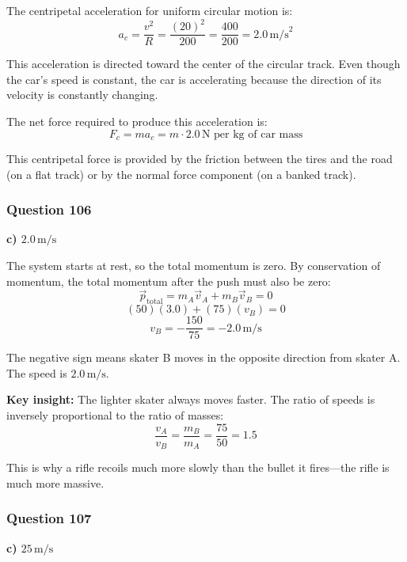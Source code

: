 \documentclass[12pt,letterpaper]{article}
\begin{document}
\begin{explanationbox}
The centripetal acceleration for uniform circular motion is:
\[
a_c = \frac{v^2}{R} = \frac{(20)^2}{200} = \frac{400}{200} = 2.0\,\text{m/s}^2
\]

This acceleration is directed toward the center of the circular track. Even though the car's speed is constant, the car is accelerating because the direction of its velocity is constantly changing.

The net force required to produce this acceleration is:
\[
F_c = ma_c = m \cdot 2.0\,\text{N per kg of car mass}
\]

This centripetal force is provided by the friction between the tires and the road (on a flat track) or by the normal force component (on a banked track).
\end{explanationbox}

\subsubsection*{Question 106}

\begin{answerbox}
\textbf{c) $2.0\,\text{m/s}$}
\end{answerbox}

\begin{explanationbox}
The system starts at rest, so the total momentum is zero. By conservation of momentum, the total momentum after the push must also be zero:
\[
\vec{p}_{\text{total}} = m_A \vec{v}_A + m_B \vec{v}_B = 0
\]
\[
(50)(3.0) + (75)(v_B) = 0
\]
\[
v_B = -\frac{150}{75} = -2.0\,\text{m/s}
\]

The negative sign means skater B moves in the opposite direction from skater A. The speed is $2.0\,\text{m/s}$.

\textbf{Key insight:} The lighter skater always moves faster. The ratio of speeds is inversely proportional to the ratio of masses:
\[
\frac{v_A}{v_B} = \frac{m_B}{m_A} = \frac{75}{50} = 1.5
\]

This is why a rifle recoils much more slowly than the bullet it fires---the rifle is much more massive.
\end{explanationbox}

\subsubsection*{Question 107}

\begin{answerbox}
\textbf{c) $25\,\text{m/s}$}
\end{answerbox}
\end{document}
